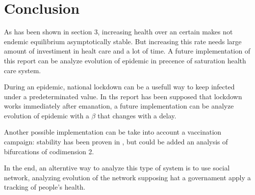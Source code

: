\section{Conclusion}
As has been shown in section 3, increasing health over an certain makes not endemic equilibrium asymptotically stable. But increasing this rate needs large amount of investiment in healt care and a lot of time. A future implementation of this report can be analyze evolution of epidemic in precence of saturation health care system.

During an epidemic, national lockdown can be a usefull way to keep infected under a predeterminated value. In ths report has been supposed that lockdown works immediately after emanation, a future implementation can be analyze evolution of epidemic with a $\beta$ that changes with a delay.

Another possible implementation can be take into account a vaccination campaign: stability has been proven in \cite{bib:sir_stability}, but could be added an analysis of bifurcations of codimension 2.

In the end, an alterntive way to analyze this type of system is to use social network, analyzing evolution of the network supposing hat a governament apply a tracking of people's health.
